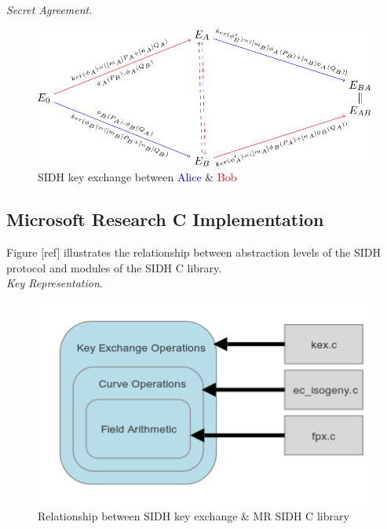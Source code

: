 \noindent
\textit{Secret Agreement}.\\

\begin{figure}[htb]
\centering
\includegraphics[scale=0.5]{keyexchange.png} %
\caption{SIDH key exchange between \textcolor{blue}{Alice} \& \textcolor{red}{Bob}}
\label{fig:kex} %
\end{figure}


\subsection{Microsoft Research C Implementation}

Figure [ref] illustrates the relationship between abstraction levels of the SIDH protocol and modules of the SIDH C library.\\

\noindent
\emph{Key Representation}.

\begin{figure}[htb]
\centering
\includegraphics[scale=0.7]{halfmapwcurve.png} %
\caption{Relationship between SIDH key exchange \& MR SIDH C library}
\label{fig:halfmap} %
\end{figure}

